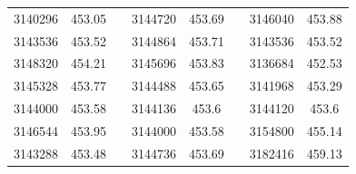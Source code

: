 \documentclass[12pt]{mwart}
\begin{document}
\begin{table}[H]
\begin{tabular}{cclcclcc}
		3140296                                                  & 453.05                                                        &  & 3144720                                                  & 453.69                                                        &  & 3146040                                                  & 453.88                                                        \\
		3143536                                                  & 453.52                                                        &  & 3144864                                                  & 453.71                                                        &  & 3143536                                                  & 453.52                                                        \\
		3148320                                                  & 454.21                                                        &  & 3145696                                                  & 453.83                                                        &  & 3136684                                                  & 452.53                                                        \\
		3145328                                                  & 453.77                                                        &  & 3144488                                                  & 453.65                                                        &  & 3141968                                                  & 453.29                                                        \\
		3144000                                                  & 453.58                                                        &  & 3144136                                                  & 453.6                                                         &  & 3144120                                                  & 453.6                                                         \\
		3146544                                                  & 453.95                                                        &  & 3144000                                                  & 453.58                                                        &  & 3154800                                                  & 455.14                                                        \\
		3143288                                                  & 453.48                                                        &  & 3144736                                                  & 453.69                                                        &  & 3182416                                                  & 459.13                                                        \\

\end{tabular}
\end{table}
\end{document}
